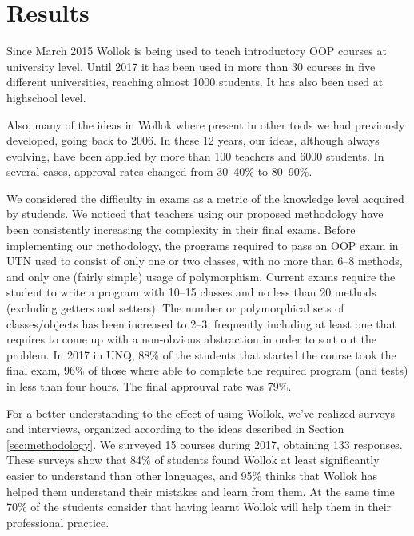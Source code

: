 \section{Results}
\label{sec:results}
Since March 2015 Wollok is being used to teach introductory OOP courses at university level.
Until 2017 it has been used in more than 30 courses in five different universities, reaching almost 1000 students.
It has also been used at highschool level.

Also, many of the ideas in Wollok where present in other tools we had previously developed, going back to 2006. 
In these 12 years, our ideas, although always evolving, have been applied by more than 100 teachers and 6000 students. 
In several cases, approval rates changed from 30--40\% to 80--90\%.

We considered the difficulty in exams as a metric of the knowledge level acquired by studends.
We noticed that teachers using our proposed methodology have been consistently increasing the complexity in their final exams.
Before implementing our methodology, the programs required to pass an OOP exam in UTN 
used to consist of only one or two classes, with no more than 6--8 methods, and only one (fairly simple) usage of polymorphism.
Current exams require the student to write a program with 10--15 classes and no less than 20 methods (excluding getters and setters).
The number or polymorphical sets of classes/objects has been increased to 2--3, 
frequently including at least one that requires to come up with a non-obvious abstraction in order to sort out the problem.
In 2017 in UNQ, 88\% of the students that started the course took the final exam,
96\% of those where able to complete the required program (and tests) in less than four hours.
The final approuval rate was 79\%.

\medskip
For a better understanding to the effect of using Wollok, we've realized surveys and interviews, organized according to the ideas described in Section \ref{sec:methodology}.
We surveyed 15 courses during 2017, obtaining 133 responses.
These surveys show that 84\% of students found Wollok at least significantly easier to understand than other languages,
and 95\% thinks that Wollok has helped them understand their mistakes and learn from them.
At the same time 70\% of the students consider that having learnt Wollok will help them in their professional practice.

